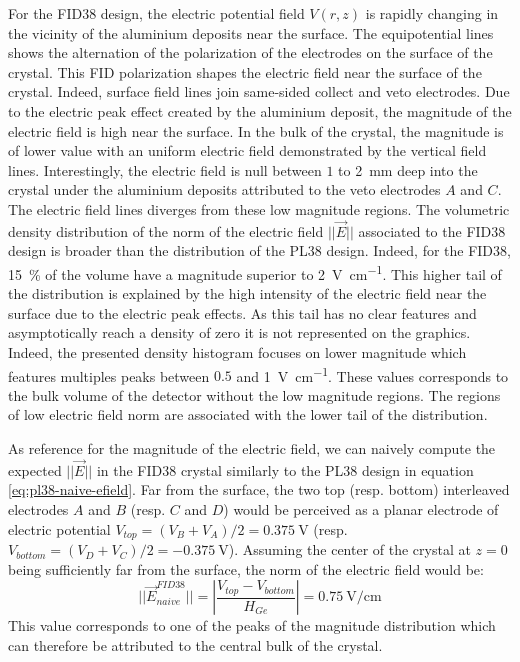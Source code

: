 For the FID38 design, the electric potential field $V(r,z)$ is rapidly changing in the vicinity of the aluminium deposits near the surface. The equipotential lines shows the alternation of the polarization of the electrodes on the surface of the crystal. This FID polarization shapes the electric field near the surface of the crystal. Indeed, surface field lines join same-sided collect and veto electrodes. Due to the electric peak effect created by the aluminium deposit, the magnitude of the electric field is high near the surface. In the bulk of the crystal, the magnitude is of lower value with an uniform electric field demonstrated by the vertical field lines. Interestingly, the electric field is null between $1$ to \SI{2}{\mm} deep into the crystal under the aluminium deposits attributed to the veto electrodes $A$ and $C$. The electric field lines diverges from these low magnitude regions.
The volumetric density distribution of the norm of the electric field $||\vec{E}||$ associated to the FID38 design is broader than the distribution of the PL38 design. Indeed, for the FID38, \SI{15}{\percent} of the volume have a magnitude superior to \SI{2}{\volt\per\cm}. This higher tail of the distribution is explained by the high intensity of the electric field near the surface due to the electric peak effects. As this tail has no clear features and asymptotically reach a density of zero it is not represented on the graphics. Indeed, the presented density histogram focuses on lower magnitude which features multiples peaks between $0.5$ and \SI{1}{\volt\per\cm}. These values corresponds to the bulk volume of the detector without the low magnitude regions. The regions of low electric field norm are associated with the lower tail of the distribution.

As reference for the magnitude of the electric field, we can naively compute the expected $||\vec{E}||$ in the FID38 crystal similarly to the PL38 design in equation \ref{eq:pl38-naive-efield}. Far from the surface, the two top (resp. bottom) interleaved electrodes $A$ and $B$ (resp. $C$ and $D$) would be perceived as a planar electrode of electric potential $V_{top} = (V_B + V_A)/2 = \SI{0.375}{\volt}$ (resp. $V_{bottom} = (V_D + V_C)/2 = -\SI{0.375}{\volt}$). Assuming the center of the crystal at $z=0$ being sufficiently far from the surface, the norm of the electric field would be:
\begin{equation}
\label{eq:fid38-naive-efield}
|| \vec{E}_{naive}^{FID38} || = \left| \frac{V_{top} - V_{bottom}}{H_{Ge}} \right| = \SI{0.75}{\volt\per\cm}
\end{equation}
This value corresponds to one of the peaks of the magnitude distribution which can therefore be attributed to the central bulk of the crystal.

